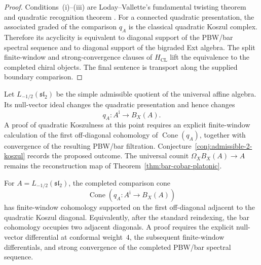 \begin{proof}
Conditions~\textup{(i)}--\textup{(iii)} are
Loday--Vallette's fundamental twisting theorem and quadratic
recognition theorem
\cite[Theorems~2.3.2 and~3.4.6]{LV12}.
For a connected quadratic presentation, the associated graded of the
comparison \(q_A\) is the classical quadratic Koszul complex.
Therefore its acyclicity is equivalent to diagonal support of the
PBW/bar spectral sequence and to diagonal support of the bigraded
Ext algebra.  The split finite-window and strong-convergence clauses
of \(H_{\mathrm{CL}}\) lift the equivalence to the completed chiral
objects.  The final sentence is transport along the supplied
boundary comparison.
\end{proof}

\begin{example}
\label{ex:admissible-sl2-failure}
Let \(L_{-1/2}(\mathfrak{sl}_2)\) be the simple admissible quotient of
the universal affine algebra.  Its null-vector ideal changes the
quadratic presentation and hence changes
\[
q_A\colon A^{\mathrm i}\longrightarrow B_X(A).
\]
A proof of quadratic Koszulness at this point requires an
explicit finite-window calculation of the first off-diagonal
cohomology of \(\operatorname{Cone}(q_A)\), together with convergence
of the resulting PBW/bar filtration.  Conjecture~\ref{conj:admissible-2-koszul}
records the proposed outcome.  The universal counit
\(\Omega_XB_X(A)\to A\) remains the reconstruction map of
Theorem~\ref{thm:bar-cobar-platonic}.
\end{example}

\begin{conjecture}
\label{conj:admissible-2-koszul}%
%
For \(A=L_{-1/2}(\mathfrak{sl}_2)\), the completed comparison cone
\[
\operatorname{Cone}\!\left(
q_A\colon A^{\mathrm i}\longrightarrow B_X(A)
\right)
\]
has finite-window cohomology supported on the first off-diagonal
adjacent to the quadratic Koszul diagonal.  Equivalently, after the
standard reindexing, the bar cohomology occupies two adjacent
diagonals.  A proof requires the explicit null-vector differential at
conformal weight~\(4\), the subsequent finite-window differentials,
and strong convergence of the completed PBW/bar spectral sequence.
\end{conjecture}

